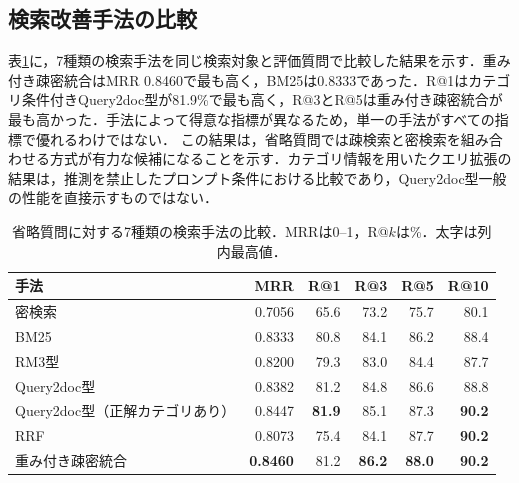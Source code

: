 \documentclass[twocolumn,a4paper,10pt]{ltjsarticle}
\begin{document}
\subsection{検索改善手法の比較}
表\ref{tab:methods}に，7種類の検索手法を同じ検索対象と評価質問で比較した結果を示す．重み付き疎密統合はMRR 0.8460で最も高く，BM25は0.8333であった．R@1はカテゴリ条件付きQuery2doc型が81.9\%で最も高く，R@3とR@5は重み付き疎密統合が最も高かった．手法によって得意な指標が異なるため，単一の手法がすべての指標で優れるわけではない．
この結果は，省略質問では疎検索と密検索を組み合わせる方式が有力な候補になることを示す．カテゴリ情報を用いたクエリ拡張の結果は，推測を禁止したプロンプト条件における比較であり，Query2doc型一般の性能を直接示すものではない．
\begin{table}[tb]
\centering\small
\caption{省略質問に対する7種類の検索手法の比較．MRRは0--1，R@$k$は\%．太字は列内最高値．}\label{tab:methods}
\begin{tabular}{lrrrrr}
\toprule
手法 & MRR & R@1 & R@3 & R@5 & R@10 \\
\midrule
密検索 & 0.7056 & 65.6 & 73.2 & 75.7 & 80.1 \\
BM25 & 0.8333 & 80.8 & 84.1 & 86.2 & 88.4 \\
RM3型 & 0.8200 & 79.3 & 83.0 & 84.4 & 87.7 \\
Query2doc型 & 0.8382 & 81.2 & 84.8 & 86.6 & 88.8 \\
Query2doc型（正解カテゴリあり） & 0.8447 & \textbf{81.9} & 85.1 & 87.3 & \textbf{90.2} \\
RRF & 0.8073 & 75.4 & 84.1 & 87.7 & \textbf{90.2} \\
重み付き疎密統合 & \textbf{0.8460} & 81.2 & \textbf{86.2} & \textbf{88.0} & \textbf{90.2} \\
\bottomrule
\end{tabular}
\end{table}
\end{document}
